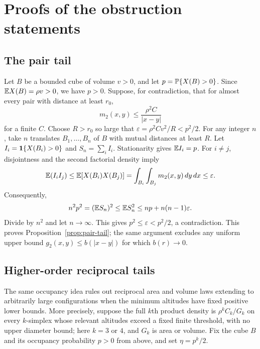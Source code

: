 \section{Proofs of the obstruction statements}
\label{app:obstructions}

\subsection{The pair tail}

Let $B$ be a bounded cube of volume $v>0$, and let $p=\mathbb P\{X(B)>0\}$. Since $\mathbb EX(B)=\rho v>0$, we have $p>0$. Suppose, for contradiction, that for almost every pair with distance at least $r_0$,
\[
 m_2(x,y)\leq\frac{\rho^2C}{|x-y|}
\]
for a finite $C$. Choose $R>r_0$ so large that $\varepsilon=\rho^2Cv^2/R<p^2/2$. For any integer $n$, take $n$ translates $B_1,\ldots,B_n$ of $B$ with mutual distances at least $R$. Let $I_i=\mathbf 1\{X(B_i)>0\}$ and $S_n=\sum_i I_i$. Stationarity gives $\mathbb E I_i=p$. For $i\ne j$, disjointness and the second factorial density imply
\[
 \mathbb E(I_iI_j)\leq\mathbb E[X(B_i)X(B_j)]
 =\int_{B_i}\int_{B_j}m_2(x,y)\,dy\,dx\leq\varepsilon.
\]
Consequently,
\[
 n^2p^2=(\mathbb E S_n)^2\leq\mathbb E S_n^2
 \leq np+n(n-1)\varepsilon.
\]
Divide by $n^2$ and let $n\to\infty$. This gives $p^2\leq\varepsilon<p^2/2$, a contradiction. This proves Proposition~\ref{prop:pair-tail}; the same argument excludes any uniform upper bound $g_2(x,y)\leq b(|x-y|)$ for which $b(r)\to0$.

\subsection{Higher-order reciprocal tails}

The same occupancy idea rules out reciprocal area and volume laws extending to arbitrarily large configurations when the minimum altitudes have fixed positive lower bounds. More precisely, suppose the full $k$th product density is $\rho^k C_k/G_k$ on every $k$-simplex whose relevant altitudes exceed a fixed finite threshold, with no upper diameter bound; here $k=3$ or $4$, and $G_k$ is area or volume. Fix the cube $B$ and its occupancy probability $p>0$ from above, and set $\eta=p^k/2$.

